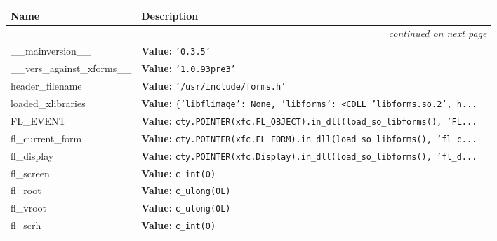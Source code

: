    \vspace{-1cm}
\hspace{\varindent}\begin{longtable}{|p{\varnamewidth}|p{\vardescrwidth}|l}
\cline{1-2}
\cline{1-2} \centering \textbf{Name} & \centering \textbf{Description}& \\
\cline{1-2}
\endhead\cline{1-2}\multicolumn{3}{r}{\small\textit{continued on next page}}\\\endfoot\cline{1-2}
\endlastfoot\raggedright \_\-\_\-m\-a\-i\-n\-v\-e\-r\-s\-i\-o\-n\-\_\-\_\- & \raggedright \textbf{Value:} 
{\tt \texttt{'}\texttt{0.3.5}\texttt{'}}&\\
\cline{1-2}
\raggedright \_\-\_\-v\-e\-r\-s\-\_\-a\-g\-a\-i\-n\-s\-t\-\_\-x\-f\-o\-r\-m\-s\-\_\-\_\- & \raggedright \textbf{Value:} 
{\tt \texttt{'}\texttt{1.0.93pre3}\texttt{'}}&\\
\cline{1-2}
\raggedright h\-e\-a\-d\-e\-r\-\_\-f\-i\-l\-e\-n\-a\-m\-e\- & \raggedright \textbf{Value:} 
{\tt \texttt{'}\texttt{/usr/include/forms.h}\texttt{'}}&\\
\cline{1-2}
\raggedright l\-o\-a\-d\-e\-d\-\_\-x\-l\-i\-b\-r\-a\-r\-i\-e\-s\- & \raggedright \textbf{Value:} 
{\tt \texttt{\{}\texttt{'}\texttt{libflimage}\texttt{'}\texttt{: }None\texttt{, }\texttt{'}\texttt{libforms}\texttt{'}\texttt{: }{\textless}CDLL 'libforms.so.2', h\texttt{...}}&\\
\cline{1-2}
\raggedright F\-L\-\_\-E\-V\-E\-N\-T\- & \raggedright \textbf{Value:} 
{\tt cty.POINTER(xfc.FL\_OBJECT).in\_dll(load\_so\_libforms(), 'FL\texttt{...}}&\\
\cline{1-2}
\raggedright f\-l\-\_\-c\-u\-r\-r\-e\-n\-t\-\_\-f\-o\-r\-m\- & \raggedright \textbf{Value:} 
{\tt cty.POINTER(xfc.FL\_FORM).in\_dll(load\_so\_libforms(), 'fl\_c\texttt{...}}&\\
\cline{1-2}
\raggedright f\-l\-\_\-d\-i\-s\-p\-l\-a\-y\- & \raggedright \textbf{Value:} 
{\tt cty.POINTER(xfc.Display).in\_dll(load\_so\_libforms(), 'fl\_d\texttt{...}}&\\
\cline{1-2}
\raggedright f\-l\-\_\-s\-c\-r\-e\-e\-n\- & \raggedright \textbf{Value:} 
{\tt c\_int(0)}&\\
\cline{1-2}
\raggedright f\-l\-\_\-r\-o\-o\-t\- & \raggedright \textbf{Value:} 
{\tt c\_ulong(0L)}&\\
\cline{1-2}
\raggedright f\-l\-\_\-v\-r\-o\-o\-t\- & \raggedright \textbf{Value:} 
{\tt c\_ulong(0L)}&\\
\cline{1-2}
\raggedright f\-l\-\_\-s\-c\-r\-h\- & \raggedright \textbf{Value:} 
{\tt c\_int(0)}&\\

\end{longtable}
